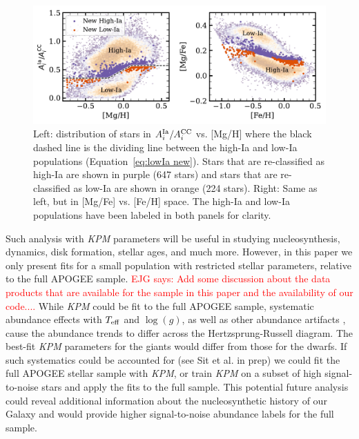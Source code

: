 \documentclass[modern]{aastex631}
\newcommand{\logg}{\log(g)}
\newcommand{\teff}{T_{\rm eff}}
\newcommand{\Acc}{A^{\rm CC}_{i}}
\newcommand{\AIa}{A^{\rm Ia}_{i}}
\newcommand{\ejg}[1]{\textcolor{red}{EJG says: #1}}
\newcommand{\name}{\textsl{KPM}}
\begin{document}
\begin{figure}[htb!]
    \centering
    \includegraphics[width=.9\textwidth]{Paper/Figures/pop_divis.pdf}
    \caption{Left: distribution of stars in $\AIa/\Acc$ vs. [Mg/H] where the black dashed line is the dividing line between the high-Ia and low-Ia populations (Equation~\ref{eq:lowIa new}). Stars that are re-classified as high-Ia are shown in purple (647 stars) and stars that are re-classified as low-Ia are shown in orange (224 stars). Right: Same as left, but in [Mg/Fe] vs. [Fe/H] space. The high-Ia and low-Ia populations have been labeled in both panels for clarity.
    \label{fig:pop_divis}}
\end{figure}

Such analysis with \name{} parameters will be useful in studying nucleosynthesis, dynamics, disk formation, stellar ages, and much more. However, in this paper we only present fits for a small population with restricted stellar parameters, relative to the full APOGEE sample. 
\ejg{Add some discussion about the data products that are available for the sample in this paper and the availability of our code....} While \name{} could be fit to the full APOGEE sample, systematic abundance effects with $\teff$ and $\logg$, as well as other abundance artifacts \citep[e.g.,][]{jonsson2020, griffith2021a}, cause the abundance trends to differ across the Hertzsprung-Russell diagram. The best-fit \name{} parameters for the giants would differ from those for the dwarfs. If such systematics could be accounted for (see Sit et al. in prep) we could fit the full APOGEE stellar sample with \name{}, or train \name{} on a subset of high signal-to-noise stars and apply the fits to the full sample. This potential future analysis could reveal additional information about the nucleosynthetic history of our Galaxy and would provide higher signal-to-noise abundance labels for the full sample.
\end{document}
